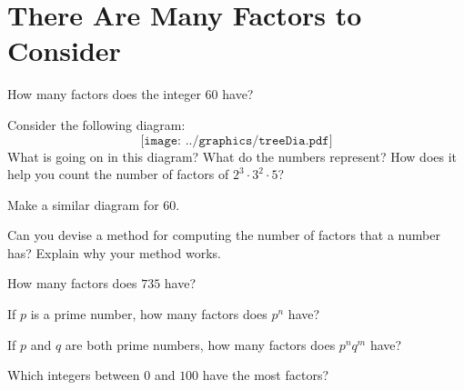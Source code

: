 \newpage
\section{There Are Many Factors to Consider}\label{A:CF}

\begin{prob} How many factors does the integer $60$ have?
\end{prob}

\begin{prob}
Consider the following diagram:
\[
\texttt{[image: ../graphics/treeDia.pdf]}
\]
What is going on in this diagram? What do the numbers represent? How
does it help you count the number of factors of $2^3\cdot 3^2 \cdot
5$?
\end{prob}

\begin{prob}
Make a similar diagram for $60$.
\end{prob}

\begin{prob} 
Can you devise a method for computing the number of factors that a
number has? Explain why your method works.
\end{prob}

\begin{prob} How many factors does $735$ have?
\end{prob}

\begin{prob} 
If $p$ is a prime number, how many factors does $p^n$ have?
\end{prob}

\begin{prob} 
If $p$ and $q$ are both prime numbers, how many factors does $p^nq^m$
have?
\end{prob}

\begin{prob} Which integers between $0$ and $100$ have the most factors?         
\end{prob}
